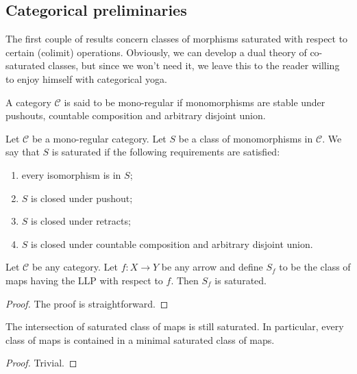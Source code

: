 \subsection{Categorical preliminaries}

The first couple of results concern classes of morphisms saturated with respect to certain (colimit) operations. Obviously, we can develop a dual theory of co-saturated classes, but since we won't need it, we leave this to the reader willing to enjoy himself with categorical yoga.

\begin{defin}
A category $\mathcal C$ is said to be mono-regular if monomorphisms are stable under pushouts, countable composition and arbitrary disjoint union.
\end{defin}

\begin{defin} \label{defin saturation}
Let $\mathcal C$ be a mono-regular category. Let $S$ be a class of monomorphisms in $\mathcal C$. We say that $S$ is saturated if the following requirements are satisfied:
\begin{enumerate}
\item every isomorphism is in $S$;
\item $S$ is closed under pushout;
\item $S$ is closed under retracts;
\item $S$ is closed under countable composition and arbitrary disjoint union.
\end{enumerate}
\end{defin}

\begin{lemma} \label{lemma llp saturation}
Let $\mathcal C$ be any category. Let $f \colon X \to Y$ be any arrow and define $S_f$ to be the class of maps having the LLP with respect to $f$. Then $S_f$ is saturated.
\end{lemma}

\begin{proof}
The proof is straightforward.
\end{proof}

\begin{lemma} \label{lemma intersection saturated classes}
The intersection of saturated class of maps is still saturated. In particular, every class of maps is contained in a minimal saturated class of maps.
\end{lemma}

\begin{proof}
Trivial.
\end{proof}

